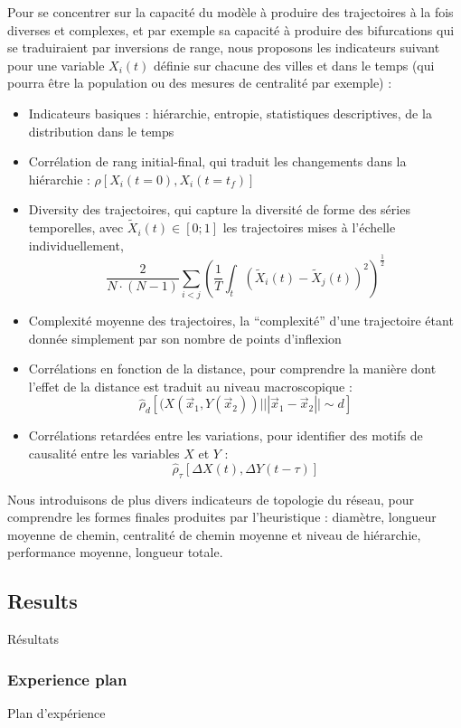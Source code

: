 Pour se concentrer sur la capacité du modèle à produire des trajectoires à la fois diverses et complexes, et par exemple sa capacité à produire des bifurcations qui se traduiraient par inversions de range, nous proposons les indicateurs suivant pour une variable $X_i(t)$ définie sur chacune des villes et dans le temps (qui pourra être la population ou des mesures de centralité par exemple) :

\begin{itemize}
  \item Indicateurs basiques : hiérarchie, entropie, statistiques descriptives, de la distribution dans le temps
  \item Corrélation de rang initial-final, qui traduit les changements dans la hiérarchie : $\rho\left[X_i(t=0),X_i(t=t_f)\right]$
  \item Diversity des trajectoires, qui capture la diversité de forme des séries temporelles, avec $\tilde{X}_i(t)\in \left[0;1\right]$ les trajectoires mises à l'échelle individuellement,
\[
\frac{2}{N\cdot(N-1)}\sum_{i<j} \left(\frac{1}{T}\int_{t} \left(\tilde{X}_i(t) - \tilde{X}_j(t)\right)^2 \right)^{\frac{1}{2}}
\]
\item Complexité moyenne des trajectoires, la ``complexité'' d'une trajectoire étant donnée simplement par son nombre de points d'inflexion
\item Corrélations en fonction de la distance, pour comprendre la manière dont l'effet de la distance est traduit au niveau macroscopique : 
\[
\hat{\rho}_d\left[(X(\vec{x}_1,Y(\vec{x}_2))|||\vec{x}_1-\vec{x}_2||\sim d\right]
\]
\item Corrélations retardées entre les variations, pour identifier des motifs de causalité entre les variables $X$ et $Y$ : \[
\hat{\rho}_{\tau}\left[\Delta X(t),\Delta Y(t-\tau)\right]
\]
\end{itemize}



Nous introduisons de plus divers indicateurs de topologie du réseau, pour comprendre les formes finales produites par l'heuristique : diamètre, longueur moyenne de chemin, centralité de chemin moyenne et niveau de hiérarchie, performance moyenne, longueur totale.




\subsection{Results}{Résultats}


\subsubsection{Experience plan}{Plan d'expérience}

